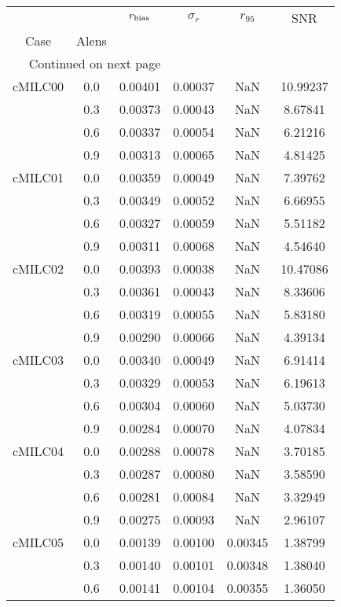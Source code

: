 \begin{longtable}{cccccc}
\toprule
        &     &  $r_{\rm bias}$  &  $\sigma_r$ &  $r_{95}$ &      SNR \\
Case & Alens &                  &             &           &          \\
\midrule
\endhead
\midrule
\multicolumn{3}{r}{{Continued on next page}} \\
\midrule
\endfoot

\bottomrule
\endlastfoot
cMILC00 & 0.0 & 0.00401 & 0.00037 & NaN & 10.99237 \\
        & 0.3 & 0.00373 & 0.00043 & NaN & 8.67841 \\
        & 0.6 & 0.00337 & 0.00054 & NaN & 6.21216 \\
        & 0.9 & 0.00313 & 0.00065 & NaN & 4.81425 \\
cMILC01 & 0.0 & 0.00359 & 0.00049 & NaN & 7.39762 \\
        & 0.3 & 0.00349 & 0.00052 & NaN & 6.66955 \\
        & 0.6 & 0.00327 & 0.00059 & NaN & 5.51182 \\
        & 0.9 & 0.00311 & 0.00068 & NaN & 4.54640 \\
cMILC02 & 0.0 & 0.00393 & 0.00038 & NaN & 10.47086 \\
        & 0.3 & 0.00361 & 0.00043 & NaN & 8.33606 \\
        & 0.6 & 0.00319 & 0.00055 & NaN & 5.83180 \\
        & 0.9 & 0.00290 & 0.00066 & NaN & 4.39134 \\
cMILC03 & 0.0 & 0.00340 & 0.00049 & NaN & 6.91414 \\
        & 0.3 & 0.00329 & 0.00053 & NaN & 6.19613 \\
        & 0.6 & 0.00304 & 0.00060 & NaN & 5.03730 \\
        & 0.9 & 0.00284 & 0.00070 & NaN & 4.07834 \\
cMILC04 & 0.0 & 0.00288 & 0.00078 & NaN & 3.70185 \\
        & 0.3 & 0.00287 & 0.00080 & NaN & 3.58590 \\
        & 0.6 & 0.00281 & 0.00084 & NaN & 3.32949 \\
        & 0.9 & 0.00275 & 0.00093 & NaN & 2.96107 \\
cMILC05 & 0.0 & 0.00139 & 0.00100 & 0.00345 & 1.38799 \\
        & 0.3 & 0.00140 & 0.00101 & 0.00348 & 1.38040 \\
        & 0.6 & 0.00141 & 0.00104 & 0.00355 & 1.36050 \\

\end{longtable}
